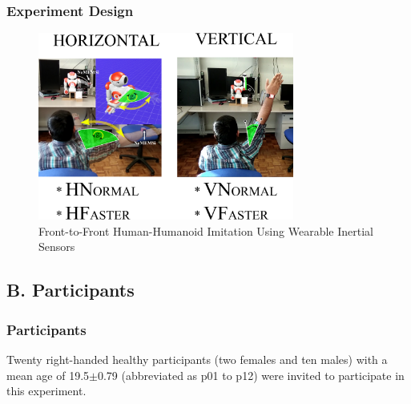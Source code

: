 \documentclass{beamer}
\begin{document}
\begin{frame}
\frametitle{ Experiment Design }
\vspace{-0.7cm}


\begin{figure}[!htb]
\centering
\includegraphics[width=0.75\textwidth]{Xochicale2017Presentation}
\caption[PA]{Front-to-Front Human-Humanoid Imitation Using Wearable Inertial Sensors
}
\label{fig:sn}
\end{figure}

\end{frame}





\subsection{B. Participants}



\begin{frame}
\frametitle{Participants}
\vspace{-0.7cm}

Twenty right-handed healthy participants (two females and
ten males) with a mean age of 19.5$\pm$0.79
(abbreviated as p01 to p12) were invited to participate in this experiment.

\end{frame}
\end{document}
